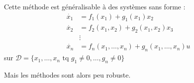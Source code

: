 \documentclass[main.tex]{subfiles}
\begin{document}
\begin{rem}
Cette méthode est généralisable à des systèmes sans forme :
\begin{align*}
\dot{x_1} & = f_1(x_1) + g_1(x_1)x_2 \\
\dot{x_2} & = f_2(x_1,x_2) + g_2(x_1,x_2)x_3 \\
& \vdots \\
\dot{x_n} & = f_n(x_1,\dots,x_n) + g_n(x_1,\dots,x_n)u
\end{align*}
sur $\mathcal{D} = \{x_1,\dots,x_n \text{ tq } g_1 \neq 0,\dots,g_n\neq 0 \}$
\end{rem}
Mais les méthodes sont alors peu robuste.
\end{document}
